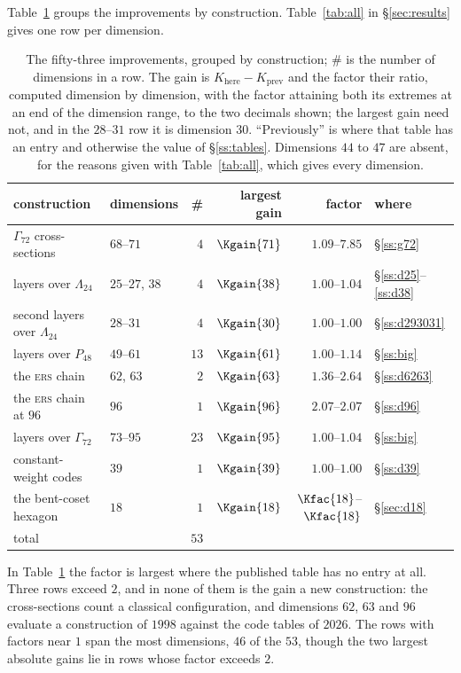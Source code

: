 \documentclass[11pt]{amsart}
\theoremstyle{remark}
\newcommand{\Leech}{\Lambda_{24}}
\newcommand{\Pff}{P_{48}}
\newcommand{\Gsz}{\Gamma_{72}}
\begin{document}
Table~\ref{tab:summary} groups the improvements by construction.
Table~\ref{tab:all} in \S\ref{sec:results} gives one row per dimension.

\begin{table}[ht]
\caption{The fifty-three improvements, grouped by construction; $\#$ is the number
of dimensions in a row. The gain is $K_{\mathrm{here}}-K_{\mathrm{prev}}$ and the
factor their ratio, computed dimension by dimension, with the factor
attaining both its extremes at an end of the dimension range, to the two decimals
shown; the largest gain need not, and in the $28$--$31$ row it is dimension $30$. ``Previously'' is \cite{cohn-table}
where that table has an entry and otherwise the value of \S\ref{ss:tables}.
Dimensions $44$ to $47$ are absent, for the reasons given with
Table~\ref{tab:all}, which gives every dimension.}
\label{tab:summary}
\small\setlength{\tabcolsep}{4.5pt}
\begin{tabular}{llrrrl}
\toprule
construction & dimensions & \# & largest gain & factor & where\\
\midrule
$\Gsz$ cross-sections & $68$--$71$ & $4$ & $\Kgain{71}$ & $1.09$--$7.85$ & \S\ref{ss:g72}\\
layers over $\Leech$ & $25$--$27$, $38$ & $4$ & $\Kgain{38}$ & $1.00$--$1.04$ & \S\ref{ss:d25}--\ref{ss:d38}\\
second layers over $\Leech$ & $28$--$31$ & $4$ & $\Kgain{30}$ & $1.00$--$1.00$ & \S\ref{ss:d293031}\\
layers over $\Pff$ & $49$--$61$ & $13$ & $\Kgain{61}$ & $1.00$--$1.14$ & \S\ref{ss:big}\\
the \textsc{ers} chain & $62$, $63$ & $2$ & $\Kgain{63}$ & $1.36$--$2.64$ & \S\ref{ss:d6263}\\
the \textsc{ers} chain at $96$ & $96$ & $1$ & $\Kgain{96}$ & $2.07$--$2.07$ & \S\ref{ss:d96}\\
layers over $\Gsz$ & $73$--$95$ & $23$ & $\Kgain{95}$ & $1.00$--$1.04$ & \S\ref{ss:big}\\
constant-weight codes & $39$ & $1$ & $\Kgain{39}$ & $1.00$--$1.00$ & \S\ref{ss:d39}\\
the bent-coset hexagon & $18$ & $1$ & $\Kgain{18}$ & $\Kfac{18}$--$\Kfac{18}$ & \S\ref{sec:d18}\\
\midrule
total & & $53$ & & &\\
\bottomrule
\end{tabular}
\end{table}

In Table~\ref{tab:summary} the factor is largest where the published table has no
entry at all. Three rows exceed $2$, and in none of them is the gain a new
construction: the cross-sections count a classical configuration, and dimensions
$62$, $63$ and $96$ evaluate a construction of $1998$ against the code tables of
$2026$. The rows
with factors near $1$ span the most dimensions, $46$ of the $53$, though the two
largest absolute gains lie in rows whose factor exceeds $2$.
\end{document}
